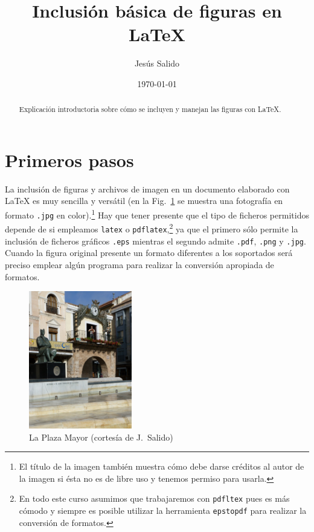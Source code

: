\documentclass[11pt,a4paper]{article}
\author{Jesús Salido}
\title{Inclusión básica de figuras en \LaTeX{}}
\date{\today}
\begin{document}
\maketitle

\begin{abstract}
	Explicación introductoria sobre cómo se incluyen y manejan las figuras con \LaTeX{}.
\end{abstract}

\tableofcontents
\listoffigures


\section{Primeros pasos}
La inclusión de figuras y archivos de imagen en un documento elaborado con \LaTeX{} es muy sencilla y versátil (en la Fig.~\ref{fig:plazaCR} se muestra una fotografía en formato \texttt{.jpg} en color).\footnote{El título de la imagen también muestra cómo debe darse créditos al autor de la imagen si ésta no es de libre uso y tenemos permiso para usarla.} Hay que tener presente que el tipo de ficheros permitidos depende de si empleamos \texttt{latex} o \texttt{pdflatex},\footnote{En todo este curso asumimos que trabajaremos con \texttt{pdfltex} pues es más cómodo y siempre es posible utilizar la herramienta \texttt{epstopdf} para realizar la conversión de formatos.} ya que el primero sólo permite la inclusión de ficheros gráficos \texttt{.eps} mientras el segundo admite \texttt{.pdf}, \texttt{.png} y \texttt{.jpg}. Cuando la figura original presente un formato diferentes a los soportados será preciso emplear algún programa para realizar la conversión apropiada de formatos.



\begin{figure}[hbt] %
	\centering %
	\includegraphics[height=6cm]{plazaCR} %
	\caption[Ejemplo de foto en formato jpg]{La Plaza Mayor (cortesía de J.~Salido)} %
	\label{fig:plazaCR} %
\end{figure}
\end{document}
